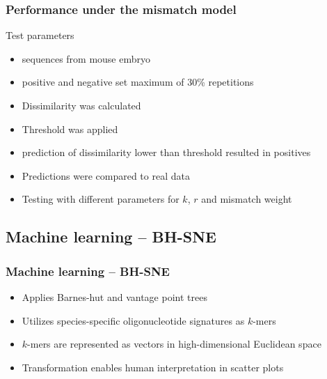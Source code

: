 \documentclass{beamer}
\begin{document}
\begin{frame}
	\frametitle{Performance under the mismatch model}
	\begin{block}{Test parameters}
		\begin{itemize}
			\item sequences from mouse embryo
			\item positive and negative set maximum of 30\% repetitions
			\item Dissimilarity was calculated
			\item Threshold was applied
			\item  prediction of dissimilarity lower than threshold resulted in positives
			\item Predictions were compared to real data
			\item Testing with different parameters for $k$, $r$ and mismatch weight
		\end{itemize}
	\end{block}
\end{frame}

\subsection{Machine learning -- BH-SNE}

\begin{frame}
	\frametitle{Machine learning -- BH-SNE}
	\begin{itemize}
		\item Applies Barnes-hut and vantage point trees
		\item Utilizes species-specific oligonucleotide signatures as $k$-mers
		\item $k$-mers are represented as vectors in high-dimensional Euclidean space
		\item Transformation enables human interpretation in scatter plots
	\end{itemize}
\end{frame}
\end{document}
